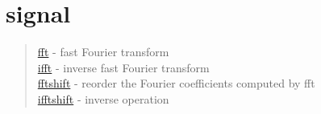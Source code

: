\chapter*{signal}

\begin{quote}
\noindent
\hyperlink{fft}{fft} - {fast Fourier transform} \\
\hyperlink{ifft}{ifft} - {inverse fast Fourier transform} \\
\hyperlink{fftshift}{fftshift} - {reorder the Fourier coefficients computed by fft} \\
\hyperlink{ifftshift}{ifftshift} - {inverse operation} \\
\end{quote}

 
 


